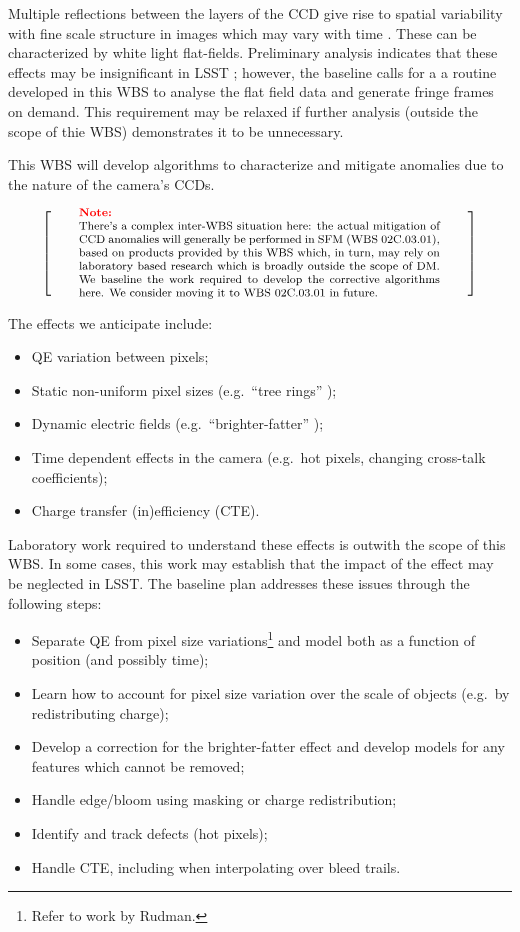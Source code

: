 \documentclass[12pt]{article}
\newcommand{\wbsSFM}{WBS 02C.03.01}
\newenvironment{note}[1][Note]
{
  \begin{displaymath}
    \left[ \qquad
    \begin{minipage}[h]{.75\linewidth}
      \color{red} \footnotesize
      \textbf{#1:} \newline
      \color{black}
}
{
    \end{minipage}
    \normalsize
    \qquad \right]
  \end{displaymath}
}
\begin{document}
Multiple reflections between the layers of the CCD give rise to spatial variability with fine scale structure in images which may vary with time \cite[\S2.5.1]{Lupton15}. These can be characterized by white light flat-fields. Preliminary analysis indicates that these effects may be insignificant in LSST \cite{Rasmussen15}; however, the baseline calls for a a routine developed in this WBS to analyse the flat field data and generate fringe frames on demand. This requirement may be relaxed if further analysis (outside the scope of thie WBS) demonstrates it to be unnecessary.


This WBS will develop algorithms to characterize and mitigate anomalies due to the nature of the camera's CCDs.

\begin{note}
There's a complex inter-WBS situation here: the actual mitigation of CCD anomalies will generally be performed in SFM (\wbsSFM{}), based on products provided by this WBS which, in turn, may rely on laboratory based research which is broadly outside the scope of DM\@. We baseline the work required to develop the corrective algorithms here. We consider moving it to \wbsSFM{} in future.
\end{note}

The effects we anticipate include:

\begin{itemize}
  \item{QE variation between pixels;}
  \item{Static non-uniform pixel sizes (e.g.\ ``tree rings'' \cite{Stubbs14});}
  \item{Dynamic electric fields (e.g.\ ``brighter-fatter'' \cite{Antilogus14});}
  \item{Time dependent effects in the camera (e.g.\ hot pixels, changing cross-talk coefficients);}
  \item{Charge transfer (in)efficiency (CTE).}
\end{itemize}

Laboratory work required to understand these effects is outwith the scope of this WBS\@. In some cases, this work may establish that the impact of the effect may be neglected in LSST\@. The baseline plan addresses these issues through the following steps:

\begin{itemize}
  \item{Separate QE from pixel size variations\footnote{Refer to work by Rudman.} and model both as a function of position (and possibly time);}
  \item{Learn how to account for pixel size variation over the scale of objects (e.g.\ by redistributing charge);}
  \item{Develop a correction for the brighter-fatter effect and develop models for any features which cannot be removed;}
  \item{Handle edge/bloom using masking or charge redistribution;}
  \item{Identify and track defects (hot pixels);}
  \item{Handle CTE, including when interpolating over bleed trails.}
\end{itemize}
\end{document}
